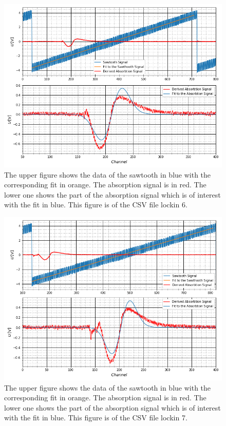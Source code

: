 	\begin{figure}[ht]
		\includegraphics[scale=0.5]{Bild/LockIn6.png}
		\centering
		\caption[Plots and Fits of Lock-In Method 6]{\small The upper figure shows the data of the sawtooth in blue with the corresponding fit in orange. The absorption signal is in red. The lower one shows the part of the absorption signal which is of interest with the fit in blue. This figure is of the CSV file lockin 6.}
		\label{Lock6}
	\end{figure}
	\begin{figure}[ht]
		\includegraphics[scale=0.5]{Bild/LockIn7.png}
		\centering
		\caption[Plots and Fits of Lock-In Method 7]{\small The upper figure shows the data of the sawtooth in blue with the corresponding fit in orange. The absorption signal is in red. The lower one shows the part of the absorption signal which is of interest with the fit in blue. This figure is of the CSV file lockin 7.}
		\label{Lock7}
	\end{figure}
